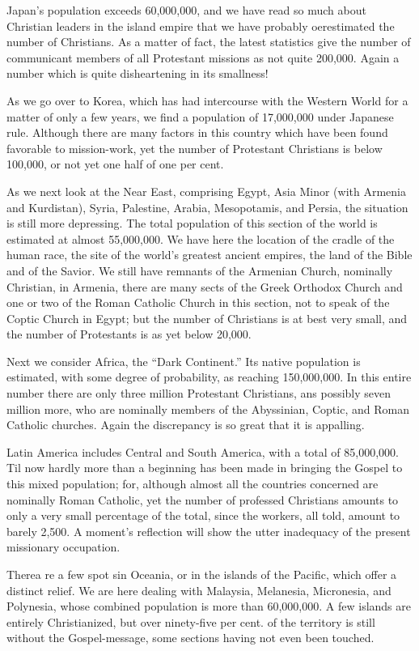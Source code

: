 \documentclass[
]{book}
\begin{document}
Japan's population exceeds 60,000,000, and we have read so much about Christian leaders in the island empire that we have probably oerestimated the number of Christians. As a matter of fact, the latest statistics give the number of communicant members of all Protestant missions as not quite 200,000. Again a number which is quite disheartening in its smallness!

As we go over to Korea, which has had intercourse with the Western World for a matter of only a few years, we find a population of 17,000,000 under Japanese rule. Although there are many factors in this country which have been found favorable to mission-work, yet the number of Protestant Christians is below 100,000, or not yet one half of one per cent.

As we next look at the Near East, comprising Egypt, Asia Minor (with Armenia and Kurdistan), Syria, Palestine, Arabia, Mesopotamis, and Persia, the situation is still more depressing. The total population of this section of the world is estimated at almost 55,000,000. We have here the location of the cradle of the human race, the site of the world's greatest ancient empires, the land of the Bible and of the Savior. We still have remnants of the Armenian Church, nominally Christian, in Armenia, there are many sects of the Greek Orthodox Church and one or two of the Roman Catholic Church in this section, not to speak of the Coptic Church in Egypt; but the number of Christians is at best very small, and the number of Protestants is as yet below 20,000.

Next we consider Africa, the ``Dark Continent.'' Its native population is estimated, with some degree of probability, as reaching 150,000,000. In this entire number there are only three million Protestant Christians, ans possibly seven million more, who are nominally members of the Abyssinian, Coptic, and Roman Catholic churches. Again the discrepancy is so great that it is appalling.

Latin America includes Central and South America, with a total of 85,000,000. Til now hardly more than a beginning has been made in bringing the Gospel to this mixed population; for, although almost all the countries concerned are nominally Roman Catholic, yet the number of professed Christians amounts to only a very small percentage of the total, since the workers, all told, amount to barely 2,500. A moment's reflection will show the utter inadequacy of the present missionary occupation.

Therea re a few spot sin Oceania, or in the islands of the Pacific, which offer a distinct relief. We are here dealing with Malaysia, Melanesia, Micronesia, and Polynesia, whose combined population is more than 60,000,000. A few islands are entirely Christianized, but over ninety-five per cent. of the territory is still without the Gospel-message, some sections having not even been touched.
\end{document}
